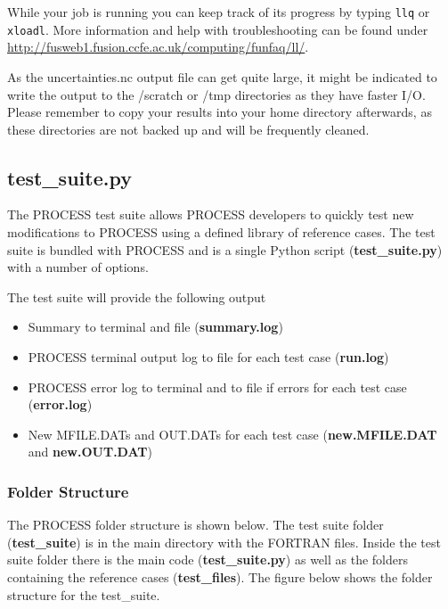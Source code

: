 \documentclass[11pt,a4paper]{article}
\begin{document}
While your job is running you can keep track of its progress by typing \texttt{llq} or \texttt{xloadl}. More information and help with troubleshooting can be found under \url{http://fusweb1.fusion.ccfe.ac.uk/computing/funfaq/ll/}.

As the uncertainties.nc output file can get quite large, it might be indicated to write the output to the /scratch or /tmp directories as they have faster I/O. Please remember to copy your results into your home directory afterwards, as these directories are not backed up and will be frequently cleaned.





\subsection{test\_suite.py}
\label{sec:testsuite}

The PROCESS test suite allows PROCESS developers to quickly test new modifications to PROCESS using a defined library of reference cases. The test suite is bundled with PROCESS and is a single Python script (\textbf{test\_suite.py}) with a number of options.

The test suite will provide the following output

\begin{itemize}
\item Summary to terminal and file (\textbf{summary.log})
\item PROCESS terminal output log to file for each test case (\textbf{run.log})
\item PROCESS error log to terminal and to file if errors for each test case (\textbf{error.log})
\item New MFILE.DATs and OUT.DATs for each test case (\textbf{new.MFILE.DAT} and \textbf{new.OUT.DAT})
\end{itemize}

\subsubsection{Folder Structure}

The PROCESS folder structure is shown below. The test suite folder (\textbf{test\_suite}) is in the main directory with the FORTRAN files. Inside the test suite folder there is the main code (\textbf{test\_suite.py}) as well as the folders containing the reference cases (\textbf{test\_files}). The figure below shows the folder structure for the test\_suite.
\end{document}
